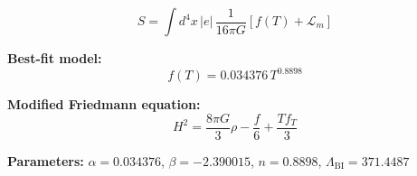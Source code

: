 
\begin{equation}
  S = \int d^4x \, |e| \, \frac{1}{16\pi G} \left[ f(T) + \mathcal{L}_m \right]
\end{equation}

\textbf{Best-fit model:}
\begin{equation}
  f(T) = 0.034376 \, T^{0.8898}
\end{equation}

\textbf{Modified Friedmann equation:}
\begin{equation}
  H^2 = \frac{8\pi G}{3} \rho - \frac{f}{6} + \frac{T f_T}{3}
\end{equation}

\textbf{Parameters:}
$\alpha = 0.034376$, \quad
$\beta = -2.390015$, \quad
$n = 0.8898$, \quad
$\Lambda_{\text{BI}} = 371.4487$